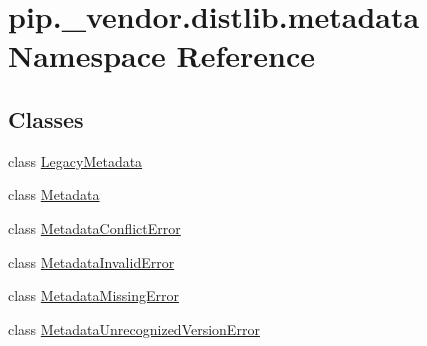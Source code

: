 \hypertarget{namespacepip_1_1__vendor_1_1distlib_1_1metadata}{}\section{pip.\+\_\+vendor.\+distlib.\+metadata Namespace Reference}
\label{namespacepip_1_1__vendor_1_1distlib_1_1metadata}
\subsection*{Classes}
\begin{DoxyCompactItemize}
\item 
class \hyperlink{classpip_1_1__vendor_1_1distlib_1_1metadata_1_1LegacyMetadata}{Legacy\+Metadata}
\item 
class \hyperlink{classpip_1_1__vendor_1_1distlib_1_1metadata_1_1Metadata}{Metadata}
\item 
class \hyperlink{classpip_1_1__vendor_1_1distlib_1_1metadata_1_1MetadataConflictError}{Metadata\+Conflict\+Error}
\item 
class \hyperlink{classpip_1_1__vendor_1_1distlib_1_1metadata_1_1MetadataInvalidError}{Metadata\+Invalid\+Error}
\item 
class \hyperlink{classpip_1_1__vendor_1_1distlib_1_1metadata_1_1MetadataMissingError}{Metadata\+Missing\+Error}
\item 
class \hyperlink{classpip_1_1__vendor_1_1distlib_1_1metadata_1_1MetadataUnrecognizedVersionError}{Metadata\+Unrecognized\+Version\+Error}
\end{DoxyCompactItemize}
